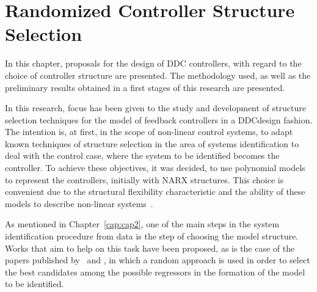 
\chapter{Randomized Controller Structure Selection}\label{cap:CCS}
\vspace{-1cm}

%
%


In this chapter, proposals for the design of DDC controllers, with regard to the choice of controller structure are presented. The methodology used, as well as the preliminary results obtained in a first stages of this research are presented.

In this research, focus has been given to the study and development of structure selection techniques for the model of feedback controllers in a DDC\@ design fashion.
The intention is, at first, in the scope of non-linear control systems, to adapt known techniques of structure selection in the area of systems identification to deal with the control case, where the system to be identified becomes the controller. To achieve these objectives, it was decided, to use polynomial models to represent the controllers, initially with NARX structures. This choice is convenient due to the structural flexibility characteristic and the ability of these models to describe non-linear systems~\citep{pearson1999, martins2013}.
%

As mentioned in Chapter~\ref{cap:cap2}, one of the main steps in the system identification procedure from data is the step of choosing the model structure. Works that aim to help on this task have been proposed, as is the case of the papers published  by~\cite{baldacchino2012,baldacchino2013} and \cite{falsone2014,falsone2015},
in which a random approach is used in order to select the best candidates among the possible regressors in the formation of the model to be identified.

